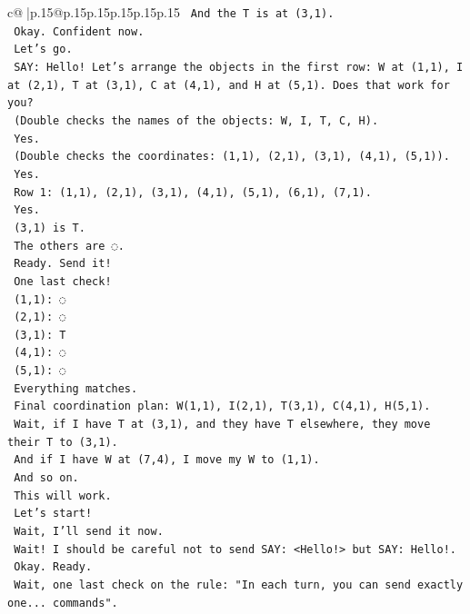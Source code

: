 \documentclass{article}
\begin{document}
{\begin{supertabular}{c@{$\;$}|p{.15\linewidth}@{}p{.15\linewidth}p{.15\linewidth}p{.15\linewidth}p{.15\linewidth}p{.15\linewidth}}
{{{\texttt{    And the T is at (3,1).} \\
\texttt{    Okay. Confident now.} \\
\texttt{    Let's go.} \\
\texttt{    SAY: Hello! Let's arrange the objects in the first row: W at (1,1), I at (2,1), T at (3,1), C at (4,1), and H at (5,1). Does that work for you?} \\
\texttt{    (Double checks the names of the objects: W, I, T, C, H).} \\
\texttt{    Yes.} \\
\texttt{    (Double checks the coordinates: (1,1), (2,1), (3,1), (4,1), (5,1)).} \\
\texttt{    Yes.} \\
\texttt{    Row 1: (1,1), (2,1), (3,1), (4,1), (5,1), (6,1), (7,1).} \\
\texttt{    Yes.} \\
\texttt{    (3,1) is T.} \\
\texttt{    The others are ◌.} \\
\texttt{    Ready. Send it!} \\
\texttt{    One last check!} \\
\texttt{    (1,1): ◌} \\
\texttt{    (2,1): ◌} \\
\texttt{    (3,1): T} \\
\texttt{    (4,1): ◌} \\
\texttt{    (5,1): ◌} \\
\texttt{    Everything matches.} \\
\texttt{    Final coordination plan: W(1,1), I(2,1), T(3,1), C(4,1), H(5,1).} \\
\texttt{    Wait, if I have T at (3,1), and they have T elsewhere, they move their T to (3,1).} \\
\texttt{    And if I have W at (7,4), I move my W to (1,1).} \\
\texttt{    And so on.} \\
\texttt{    This will work.} \\
\texttt{    Let's start!} \\
\texttt{    Wait, I'll send it now.} \\
\texttt{    Wait! I should be careful not to send SAY: <Hello!> but SAY: Hello!.} \\
\texttt{    Okay. Ready.} \\
\texttt{    Wait, one last check on the rule: "In each turn, you can send exactly one... commands".} \\
}}}
\end{supertabular}}
\end{document}
